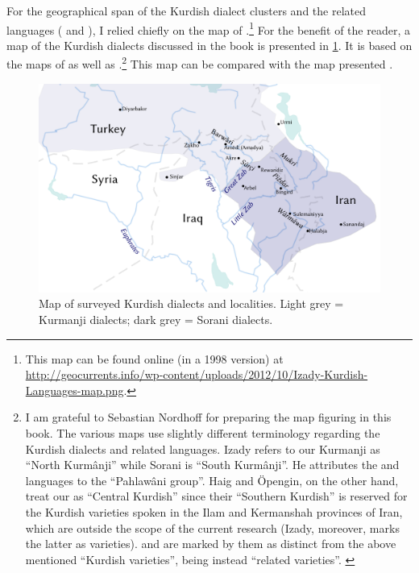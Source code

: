   For the geographical span of the Kurdish dialect clusters and the related languages ( and ), I relied chiefly on the map of \citet[171]{IzadyKurds}.\footnote{This map can be found online (in a 1998 version) at \url{http://geocurrents.info/wp-content/uploads/2012/10/Izady-Kurdish-Languages-map.png}.} For the benefit of the reader, a map of the Kurdish dialects discussed in the book is presented in \ref{fg:map_kurdish}. It is based on the maps of \citet[111]{HaigOpengin2014critical} as well as \citet[xvi]{MacKenzie}.\footnote{I am grateful to Sebastian Nordhoff for preparing the map figuring in this book. The various maps use slightly different terminology regarding the Kurdish dialects and related languages. Izady refers to our Kurmanji as \enquote{North Kurmânji} while Sorani is \enquote{South Kurmânji}. He attributes the  and  languages to the \enquote{Pahlawâni group}. Haig and Öpengin, on the other hand, treat our \Sor as \enquote{Central Kurdish} since their \enquote{Southern Kurdish} is reserved for the Kurdish varieties spoken in the Ilam and Kermanshah provinces of Iran, which are outside the scope of the current research (Izady, moreover, marks the latter as  varieties).  and  are marked by them as distinct from the above mentioned \enquote{Kurdish varieties}, being instead \enquote{related varieties}. \label{ft:gorani_zazaki}} This map can be compared with the  map presented .
  
\begin{figure}[htp]
  \includegraphics[width=\textwidth]{figures/Kurdishmap.png}
  \caption{Map of surveyed Kurdish dialects and localities. Light grey = Kurmanji dialects; dark grey = Sorani dialects.} \par \label{fg:map_kurdish} 
\end{figure}
  



